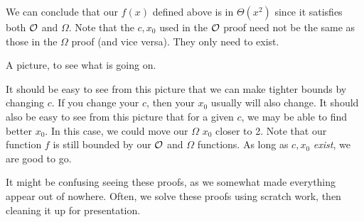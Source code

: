 \documentclass[main.tex]{subfiles}
\begin{document}
\begin{rem}
	We can conclude that our \(f(x)\) defined above is in \(\Theta(x^2)\) since it satisfies both \(\mathcal{O}\) and \(\Omega\).
	Note that the \(c,x_0\) used in the \(\mathcal{O}\) proof need not be the same as those in the \(\Omega\) proof (and vice versa).
	They only need to exist.
\end{rem}

A picture, to see what is going on.

\begin{boxx}
	\begin{center}
	\end{center}
\end{boxx}

It should be easy to see from this picture that we can make tighter bounds by changing \(c\).
If you change your \(c\), then your \(x_0\) usually will also change.
It should also be easy to see from this picture that for a given \(c\), we may be able to find better \(x_0\).
In this case, we could move our \(\Omega\) \(x_0\) closer to 2.
Note that our function \(f\) is still bounded by our \(\mathcal{O}\) and \(\Omega\) functions.
As long as \(c,x_0\) \textit{exist}, we are good to go.

It might be confusing seeing these proofs, as we somewhat made everything appear out of nowhere.
Often, we solve these proofs using scratch work, then cleaning it up for presentation.
\end{document}

